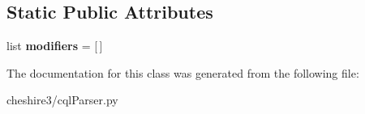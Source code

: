 \subsection*{Static Public Attributes}
\begin{DoxyCompactItemize}
\item 
\hypertarget{classcheshire3_1_1cql_parser_1_1_modifiable_object_abbfb9ddc3dc285bc95148b46661cd4df}{list {\bfseries modifiers} = \mbox{[}$\,$\mbox{]}}\label{classcheshire3_1_1cql_parser_1_1_modifiable_object_abbfb9ddc3dc285bc95148b46661cd4df}

\end{DoxyCompactItemize}


The documentation for this class was generated from the following file\-:\begin{DoxyCompactItemize}
\item 
cheshire3/cql\-Parser.\-py\end{DoxyCompactItemize}
